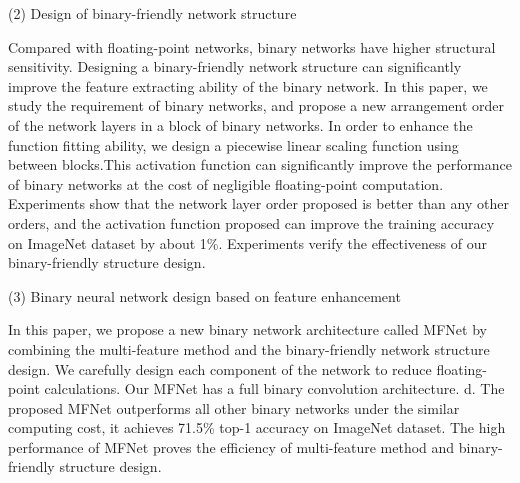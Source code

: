 \begin{abstract*}
  (2) Design of binary-friendly network structure

  Compared with floating-point networks, binary networks have higher structural sensitivity. Designing a binary-friendly network structure can significantly improve the feature extracting ability of the binary network. In this paper, we study the requirement of binary networks, and propose a new arrangement order of the network layers in a block of binary networks. In order to enhance the function fitting ability, we design a piecewise linear scaling function using between blocks.This activation function can significantly improve the performance of binary networks at the cost of negligible floating-point computation. Experiments show that the network layer order proposed is better than any other orders, and the activation function proposed can improve the training accuracy on ImageNet dataset by about 1\%. Experiments verify the effectiveness of our binary-friendly structure design.

  (3) Binary neural network design based on feature enhancement

  In this paper, we propose a new binary network architecture called MFNet by combining the multi-feature method and the binary-friendly network structure design. We carefully design each component of the network to reduce floating-point calculations. Our MFNet has a full binary convolution architecture. d. The proposed MFNet outperforms all other binary networks  under the similar computing cost, it achieves 71.5\% top-1 accuracy on ImageNet dataset. The high performance of MFNet proves the efficiency of multi-feature method and binary-friendly structure design.

\end{abstract*}
